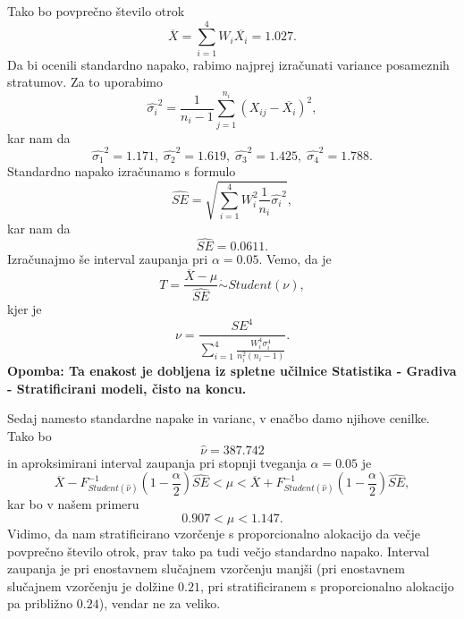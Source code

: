 \documentclass[a4paper,12pt]{article}
\begin{document}
Tako bo povprečno število otrok
\begin{equation*}
    \overline{X} = \sum_{i=1}^{4}W_{i}\overline{X_{i}} = 1.027.
\end{equation*}
Da bi ocenili standardno napako, rabimo najprej izračunati variance posameznih stratumov. Za to uporabimo
\begin{equation*}
    \widehat{\sigma_i}^{2} = \frac{1}{n_i-1}\sum_{j=1}^{n_i}(X_{ij} - \overline{X_{i}})^2, 
\end{equation*}
kar nam da
\begin{equation*}
    \widehat{\sigma_1}^{2} = 1.171, \; \widehat{\sigma_2}^{2} = 1.619, \; \widehat{\sigma_3}^{2} = 1.425, \; \widehat{\sigma_4}^{2} = 1.788.
\end{equation*}
Standardno napako izračunamo s formulo
\begin{equation*}
    \widehat{SE} = \sqrt{\sum_{i=1}^{4}W_i^2\frac{1}{n_i}\widehat{\sigma_i}^{2}},
\end{equation*}
kar nam da
\begin{equation*}
    \widehat{SE} = 0.0611.
\end{equation*}
Izračunajmo še interval zaupanja pri $\alpha=0.05$. Vemo, da je 
\begin{equation*}
    T = \frac{\overline{X}- \mu}{\widehat{SE}} \mathrel{\dot\sim} Student(\nu),
\end{equation*}
kjer je 
\begin{equation*}
    \nu = \frac{SE^4}{\sum_{i=1}^{4}\frac{W_i^4\sigma_i^4}{n_i^2(n_i -1)}}.
\end{equation*}
\textbf{Opomba: Ta enakost je dobljena iz spletne učilnice Statistika - Gradiva - Stratificirani modeli, čisto na koncu.}

Sedaj namesto standardne napake in varianc, v enačbo damo njihove cenilke. Tako bo
\begin{equation*}
    \widehat{\nu} = 387.742
\end{equation*}
in aproksimirani interval zaupanja pri stopnji tveganja $\alpha=0.05$ je
\begin{equation*}
    \overline{X} - F^{-1}_{Student(\widehat{\nu})}\left(1-\frac{\alpha}{2}\right)\widehat{SE} < \mu < \overline{X} + F^{-1}_{Student(\widehat{\nu})}\left(1-\frac{\alpha}{2}\right)\widehat{SE},
\end{equation*}
kar bo v našem primeru
\begin{equation*}
    0.907 < \mu < 1.147.
\end{equation*}
Vidimo, da nam stratificirano vzorčenje s proporcionalno alokacijo da večje povprečno število otrok, prav tako pa tudi večjo standardno napako. Interval zaupanja je pri
enostavnem slučajnem vzorčenju manjši (pri enostavnem slučajnem vzorčenju je dolžine $0.21$, pri stratificiranem s proporcionalno alokacijo
pa približno $0.24$), vendar ne za veliko.
%
%
%
%
\end{document}

